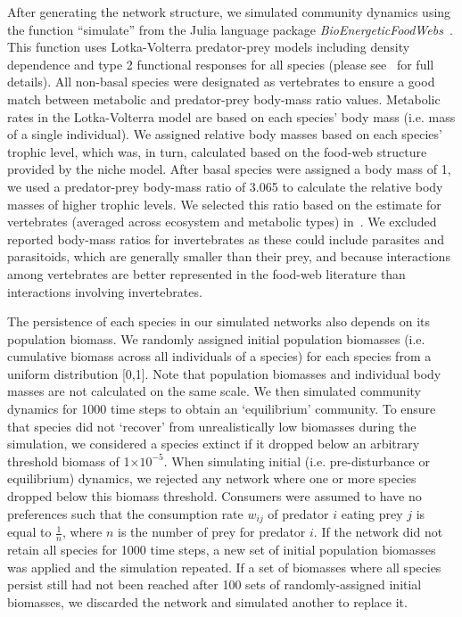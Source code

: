 \documentclass[12pt]{article}
\begin{document}
\begin{spacing}{2.0}
        After generating the network structure, we simulated community dynamics using the function ``simulate'' from the Julia language package \emph{BioEnergeticFoodWebs}~\citep{bioenergeticfw,Delmas2017}. This function uses Lotka-Volterra predator-prey models including density dependence and type 2 functional responses for all species (please see~\citet{Delmas2017} for full details).
        All non-basal species were designated as vertebrates to ensure a good match between metabolic and predator-prey body-mass ratio values. Metabolic rates in the Lotka-Volterra model are based on each species' body mass (i.e. mass of a single individual). We assigned relative body masses based on each species' trophic level, which was, in turn, calculated based on the food-web structure provided by the niche model. After basal species were assigned a body mass of 1, we used a predator-prey body-mass ratio of 3.065 to calculate the relative body masses of higher trophic levels. We selected this ratio based on the estimate for vertebrates (averaged across ecosystem and metabolic types) in~\citet{Brose2006}. We excluded reported body-mass ratios for invertebrates as these could include parasites and parasitoids, which are generally smaller than their prey, and because interactions among vertebrates are better represented in the food-web literature than interactions involving invertebrates.
        
        
        The persistence of each species in our simulated networks also depends on its population biomass. 
        We randomly assigned initial population biomasses (i.e. cumulative biomass across all individuals of a species) for each species from a uniform distribution [0,1]. Note that population biomasses and individual body masses are not calculated on the same scale. We then simulated community dynamics for 1000 time steps to obtain an `equilibrium' community. To ensure that species did not `recover' from unrealistically low biomasses during the simulation, we considered a species extinct if it dropped below an arbitrary threshold biomass of 1$\times10^{-5}$. When simulating initial (i.e. pre-disturbance or equilibrium) dynamics, we rejected any network where one or more species dropped below this biomass threshold. Consumers were assumed to have no preferences such that the consumption rate $w_{ij}$ of predator $i$ eating prey $j$ is equal to $\frac{1}{n}$, where $n$ is the number of prey for predator $i$. If the network did not retain all species for 1000 time steps, a new set of initial population biomasses was applied and the simulation repeated.
        If a set of biomasses where all species persist still had not been reached after 100 sets of randomly-assigned initial biomasses, we discarded the network and simulated another to replace it.
        

\end{spacing}
\end{document}
